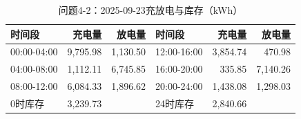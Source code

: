 \begin{table}[H]\centering\small\caption{问题4-2：2025-09-23充放电与库存（kWh）}\label{tab:q4_220250923b}
\begin{tabular}{lrrlrr}\toprule
时间段 & 充电量 & 放电量 & 时间段 & 充电量 & 放电量\\\midrule
00:00-04:00 & 9,795.98 & 1,130.50 & 12:00-16:00 & 3,854.74 & 470.98\\
04:00-08:00 & 1,112.11 & 6,745.85 & 16:00-20:00 & 335.85 & 7,140.26\\
08:00-12:00 & 6,084.33 & 1,896.62 & 20:00-24:00 & 1,438.08 & 1,298.03\\
0时库存 & 3,239.73 &  & 24时库存 & 2,840.66 & \\
\bottomrule\end{tabular}\end{table}
